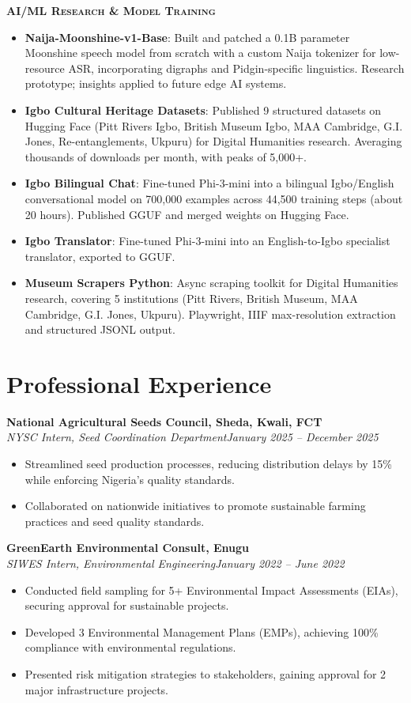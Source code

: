 \documentclass[10pt,letterpaper]{article}
\newcommand{\proj}[2]{\item \textbf{#1}: #2}
\newcommand{\role}[3]{\par\vspace{3pt}\textbf{#1}\\ \textit{#2}\hfill\textit{#3}\par}
\newcommand{\subhead}[1]{\par\vspace{4pt}\noindent\textbf{\textsc{#1}}\par\vspace{1pt}}
\begin{document}
\subhead{AI/ML Research \& Model Training}
\begin{itemize}
\proj{Naija-Moonshine-v1-Base}{Built and patched a 0.1B parameter Moonshine speech model from scratch with a custom Naija tokenizer for low-resource ASR, incorporating digraphs and Pidgin-specific linguistics. Research prototype; insights applied to future edge AI systems.}
\proj{Igbo Cultural Heritage Datasets}{Published 9 structured datasets on Hugging Face (Pitt Rivers Igbo, British Museum Igbo, MAA Cambridge, G.I. Jones, Re-entanglements, Ukpuru) for Digital Humanities research. Averaging thousands of downloads per month, with peaks of 5,000+.}
\proj{Igbo Bilingual Chat}{Fine-tuned Phi-3-mini into a bilingual Igbo/English conversational model on 700,000 examples across 44,500 training steps (about 20 hours). Published GGUF and merged weights on Hugging Face.}
\proj{Igbo Translator}{Fine-tuned Phi-3-mini into an English-to-Igbo specialist translator, exported to GGUF.}
\proj{Museum Scrapers Python}{Async scraping toolkit for Digital Humanities research, covering 5 institutions (Pitt Rivers, British Museum, MAA Cambridge, G.I. Jones, Ukpuru). Playwright, IIIF max-resolution extraction and structured JSONL output.}
\end{itemize}

\newpage
\section*{Professional Experience}

\role{National Agricultural Seeds Council, Sheda, Kwali, FCT}{NYSC Intern, Seed Coordination Department}{January 2025 -- December 2025}
\begin{itemize}
\item Streamlined seed production processes, reducing distribution delays by 15\% while enforcing Nigeria's quality standards.
\item Collaborated on nationwide initiatives to promote sustainable farming practices and seed quality standards.
\end{itemize}

\role{GreenEarth Environmental Consult, Enugu}{SIWES Intern, Environmental Engineering}{January 2022 -- June 2022}
\begin{itemize}
\item Conducted field sampling for 5+ Environmental Impact Assessments (EIAs), securing approval for sustainable projects.
\item Developed 3 Environmental Management Plans (EMPs), achieving 100\% compliance with environmental regulations.
\item Presented risk mitigation strategies to stakeholders, gaining approval for 2 major infrastructure projects.
\end{itemize}
\end{document}
